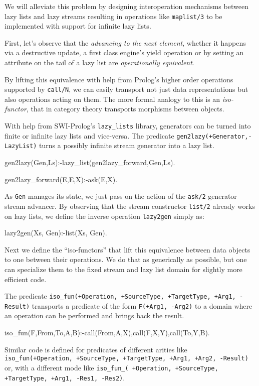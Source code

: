 \documentclass{new_tlp}
\begin{document}
We will alleviate this problem by designing interoperation mechanisms between lazy lists and lazy streams resulting in operations like {\tt maplist/3} to be implemented with support for infinite lazy lists.

First, let's observe that the {\em advancing to the next element}, 
whether it happens via a destructive update,
a first class engine's yield operation or by setting an attribute on the tail of
a lazy list are {\em operationally equivalent}.

By lifting this equivalence with help from Prolog's higher order operations
supported by {\tt call/N}, we can easily transport not just  data representations 
but also   operations acting on them.
The more formal analogy to this is an {\em iso-functor}, that in category theory
transports morphisms between objects. 

With help from SWI-Prolog's {\tt lazy\_lists} library, 
generators can be turned into finite or infinite lazy lists and vice-versa.
The predicate {\tt gen2lazy(+Generator,-LazyList)} turns a possibly infinite
stream generator into a lazy list.
\begin{code} 
gen2lazy(Gen,Ls):-lazy_list(gen2lazy_forward,Gen,Ls).

gen2lazy_forward(E,E,X):-ask(E,X).
\end{code}
As {\tt Gen}  manages its state, we just pass on the action of the {\tt ask/2}
generator stream advancer.
By observing that the stream constructor {\tt list/2} already works
on lazy lists, we define the inverse operation {\tt lazy2gen} simply as:
\begin{code}
lazy2gen(Xs, Gen):-list(Xs, Gen).
\end{code}

Next we define the ``iso-functors'' that 
lift this equivalence between data objects to 
one between their operations. We do that as generically as possible,
but one can specialize them to the fixed stream and lazy list domain
for slightly more efficient code.

The predicate 
{\tt iso\_fun(+Operation, +SourceType, +TargetType, +Arg1, -Result)}
transports a predicate of the form {\tt F(+Arg1, -Arg2)} to a domain where
an operation can be performed and brings back the result.

\begin{code}
iso_fun(F,From,To,A,B):-call(From,A,X),call(F,X,Y),call(To,Y,B).
\end{code}


Similar code is defined for predicates of different arities  like 
{\tt iso\_fun(+Operation, +SourceType, +TargetType, +Arg1, +Arg2, -Result)} 
or, with a different mode like
{\tt iso\_fun\_( +Operation, +SourceType, +TargetType, +Arg1, -Res1, -Res2)}.
\end{document}

